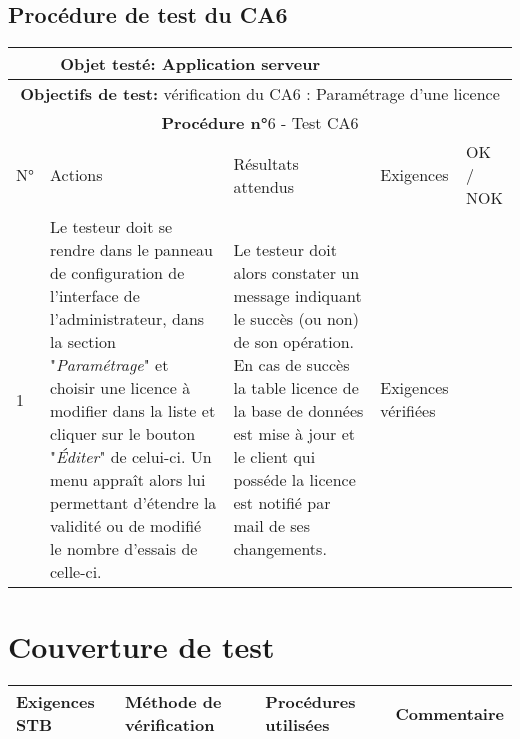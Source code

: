 \section{Procédure de test du CA6}
\begin{table}[!h]
        \centering
        \begin{tabular}{|m{0.6cm}|
                         >{\raggedright\arraybackslash}m{4cm}|
                         >{\raggedright\arraybackslash}m{6.4cm}|
                         >{\raggedright\arraybackslash}m{2cm}|
                         m{1cm}|}
            \hline
            \multicolumn{3}{|c|}{
                \textbf{Objet testé: } Application serveur
            } & \multicolumn{2}{|c|}{
                \textbf{Version: } version    
            } \\
            \hline
            \multicolumn{5}{|c|}{\textbf{Objectifs de test:} 
                vérification du CA6 : Paramétrage d'une licence} \\
            \hline
            \multicolumn{5}{|c|}{
                \textbf{Procédure n°}6 - Test CA6
            } \\
            \hline
            N° & Actions & Résultats attendus & Exigences & OK / NOK \\
            \hline      %
            1 & Le testeur doit se rendre dans le panneau de configuration
                de l'interface de l'administrateur, dans la section 
                "\emph{Paramétrage}" et choisir une licence à modifier
                dans la liste et cliquer sur le bouton "\emph{Éditer}" 
                de celui-ci. Un menu appraît alors lui permettant d'étendre
                la validité ou de modifié le nombre d'essais de celle-ci.
              & Le testeur doit alors constater un message indiquant le 
                succès (ou non) de son opération. En cas de succès la 
                table licence de la base de données est mise à jour et
                le client qui posséde la licence est notifié par mail de 
                ses changements. 
              & Exigences vérifiées & \\
            \hline
        \end{tabular} 
        \label{tab:tab6}
\end{table}
\newpage


\chapter{Couverture de test}

\begin{table}[!h]
    \centering
    \begin{tabular}{|l|l|l|l|}
        \hline
            \textbf{Exigences STB} & \textbf{Méthode de vérification} & \textbf{Procédures utilisées} & \textbf{Commentaire} \\
        \hline
    \end{tabular}
    \label{tab:tab7}
\end{table}

